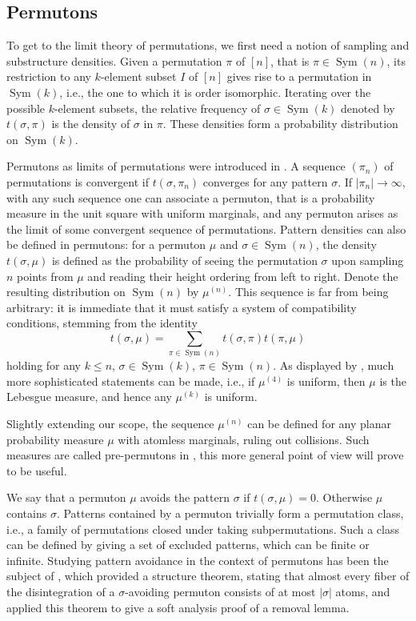 \documentclass[11pt]{article}
\newcommand{\Sym}{\mathop{\mathrm{Sym}}}
\theoremstyle{definition}
\begin{document}
\subsection{Permutons} \label{subsec:prelim_perm}

To get to the limit theory of permutations, we first need a notion of sampling and substructure densities. Given a permutation $\pi$ of $[n]$, that is $\pi\in \Sym(n)$, its restriction to any $k$-element subset $I$ of $[n]$ gives rise to a permutation in $\Sym(k)$, i.e., the one to which it is order isomorphic. Iterating over the possible $k$-element subsets, the relative frequency of $\sigma\in \Sym(k)$ denoted by $t(\sigma, \pi)$ is the density of $\sigma$ in $\pi$. These densities form a probability distribution on $\Sym(k)$.

Permutons as limits of permutations were introduced in \cite{HOPPEN201393}. A sequence $(\pi_n)$ of permutations is convergent if $t(\sigma, \pi_n)$ converges for any pattern $\sigma$. If $|\pi_n|\to\infty$, with any such sequence one can associate a permuton, that is a probability measure in the unit square with uniform marginals, and any permuton arises as the limit of some convergent sequence of permutations. Pattern densities can also be defined in permutons: for a permuton $\mu$ and $\sigma\in \Sym(n)$, the density $t(\sigma, \mu)$ is defined as the probability of seeing the permutation $\sigma$ upon sampling $n$ points from $\mu$ and reading their height ordering from left to right. Denote the resulting distribution on $\Sym(n)$ by $\mu^{(n)}$. This sequence is far from being arbitrary: it is immediate that it must satisfy a system of compatibility conditions, stemming from the identity
\begin{equation} \label{eq:compatibility_conditions}
t(\sigma, \mu) = \sum_{\pi\in \Sym(n)}t(\sigma, \pi)t(\pi, \mu) 
\end{equation}
holding for any $k\leq n$, $\sigma\in \Sym(k)$, $\pi\in \Sym(n)$. As displayed by \cite{Král2012}, much more sophisticated statements can be made, i.e., if $\mu^{(4)}$ is uniform, then $\mu$ is the Lebesgue measure, and hence any $\mu^{(k)}$ is uniform. 

Slightly extending our scope, the sequence $\mu^{(n)}$ can be defined for any planar probability measure $\mu$ with atomless marginals, ruling out collisions. Such measures are called pre-permutons in \cite{Dubach2023LocallyUR}, this more general point of view will prove to be useful.

We say that a permuton $\mu$ avoids the pattern $\sigma$ if $t(\sigma, \mu)=0$. Otherwise $\mu$ contains $\sigma$. Patterns contained by a permuton trivially form a permutation class, i.e., a family of permutations closed under taking subpermutations. Such a class can be defined by giving a set of excluded patterns, which can be finite or infinite. Studying pattern avoidance in the context of permutons has been the subject of \cite{Garbe2024}, which provided a structure theorem, stating that almost every fiber of the disintegration of a $\sigma$-avoiding permuton consists of at most $|\sigma|$ atoms, and applied this theorem to give a soft analysis proof of a removal lemma. 
\end{document}

